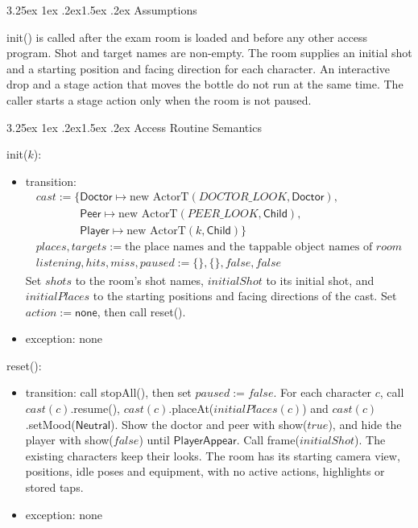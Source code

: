 \documentclass[10pt, titlepage]{article}
\makeatletter
\renewcommand\paragraph{\@startsection{paragraph}{4}{\z@}%
  {3.25ex \@plus 1ex \@minus .2ex}{1.5ex \@plus .2ex}%
  {\normalfont\normalsize\bfseries}}
\newcommand{\T}[1]{\mathit{#1}}          %
\newcommand{\V}[1]{\mathsf{#1}}          %
\newcommand{\true}{\mathit{true}}
\newcommand{\false}{\mathit{false}}
\makeatother
\begin{document}
\paragraph{Assumptions}

init() is called after the exam room is loaded and before any other access
program. Shot and target names are non-empty. The room supplies an initial shot
and a starting position and facing direction for each character.
An interactive drop and a stage action that moves the bottle do not run
at the same time. The caller starts a stage action only when the room is
not paused.

\paragraph{Access Routine Semantics}

\begin{samepage}
\noindent init($k$):
\begin{itemize}
\item transition:
  \[\begin{array}{l}
  \T{cast} := \{\V{Doctor} \mapsto \text{new ActorT}(\T{DOCTOR\_LOOK},
  \V{Doctor}),\\
  \phantom{\T{cast} := \{}\V{Peer} \mapsto \text{new ActorT}(\T{PEER\_LOOK},
  \V{Child}),\\
  \phantom{\T{cast} := \{}\V{Player} \mapsto \text{new ActorT}(k,
  \V{Child})\}\\
  \T{places}, \T{targets} := \text{the place names and the tappable object
  names of } \T{room}\\
  \T{listening}, \T{hits}, \T{miss}, \T{paused} := \{\}, \{\}, \false,
  \false
  \end{array}\]
  Set $\T{shots}$ to the room's shot names, $\T{initialShot}$ to its
  initial shot, and $\T{initialPlaces}$ to the starting positions and facing
  directions of the cast. Set $\T{action} := \V{none}$, then call reset().
\item exception: none
\end{itemize}
\end{samepage}
\par\pagebreak[0]

\begin{samepage}
\noindent reset():
\begin{itemize}
\item transition: call stopAll(), then set $\T{paused} := \false$.
  For each character $c$, call $\T{cast}(c)$.resume(),
  $\T{cast}(c)$.placeAt($\T{initialPlaces}(c)$) and
  $\T{cast}(c)$.setMood($\V{Neutral}$).
  Show the doctor and peer with show($\true$), and hide the player with
  show($\false$) until $\V{PlayerAppear}$. Call frame($\T{initialShot}$).
  The existing characters keep their looks. The room has its starting
  camera view, positions, idle poses and equipment, with no active actions,
  highlights or stored taps.
\item exception: none
\end{itemize}
\end{samepage}
\par\pagebreak[0]
\end{document}
